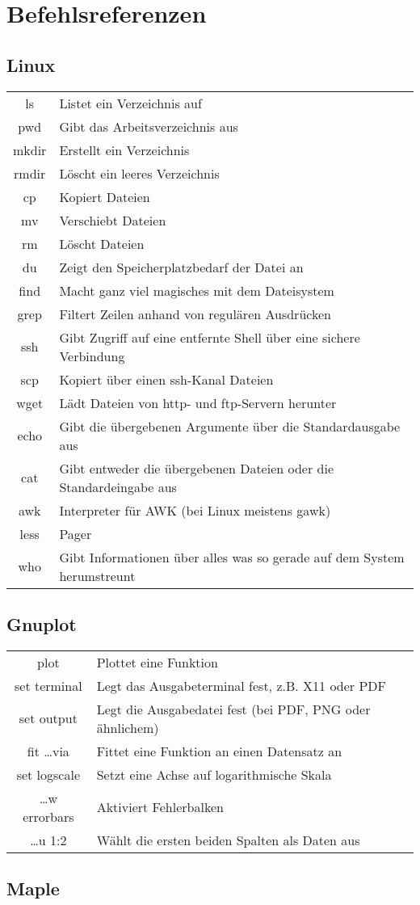 \section{Befehlsreferenzen}
\subsection{Linux}
\begin{tabular}[h!]{cl}
  ls     & Listet ein Verzeichnis auf \\
  pwd    & Gibt das Arbeitsverzeichnis aus \\
  mkdir  & Erstellt ein Verzeichnis \\
  rmdir  & Löscht ein leeres Verzeichnis \\
  cp     & Kopiert Dateien \\
  mv     & Verschiebt Dateien \\
  rm     & Löscht Dateien \\
  du     & Zeigt den Speicherplatzbedarf der Datei an \\
  find   & Macht ganz viel magisches mit dem Dateisystem \\
  grep   & Filtert Zeilen anhand von regulären Ausdrücken \\
  ssh    & Gibt Zugriff auf eine entfernte Shell über eine sichere Verbindung \\
  scp    & Kopiert über einen ssh-Kanal Dateien \\
  wget   & Lädt Dateien von http- und ftp-Servern herunter \\
  echo   & Gibt die übergebenen Argumente über die Standardausgabe aus \\
  cat    & Gibt entweder die übergebenen Dateien oder die Standardeingabe aus \\
  awk    & Interpreter für AWK (bei Linux meistens gawk) \\
  less   & Pager \\
  who    & Gibt Informationen über alles was so gerade auf dem System
           herumstreunt
\end{tabular}

\subsection{Gnuplot}
\begin{tabular}[h!]{cl}
  plot           & Plottet eine Funktion \\
  set terminal   & Legt das Ausgabeterminal fest, z.B. X11 oder PDF \\
  set output     & Legt die Ausgabedatei fest (bei PDF, PNG oder ähnlichem) \\
  fit \ldots via & Fittet eine Funktion an einen Datensatz an \\
  set logscale   & Setzt eine Achse auf logarithmische Skala \\
  \ldots w errorbars & Aktiviert Fehlerbalken \\
  \ldots u 1:2   & Wählt die ersten beiden Spalten als Daten aus
\end{tabular}

\subsection{Maple}
\begin{tabular}[h!]{cl}
  
\end{tabular}

